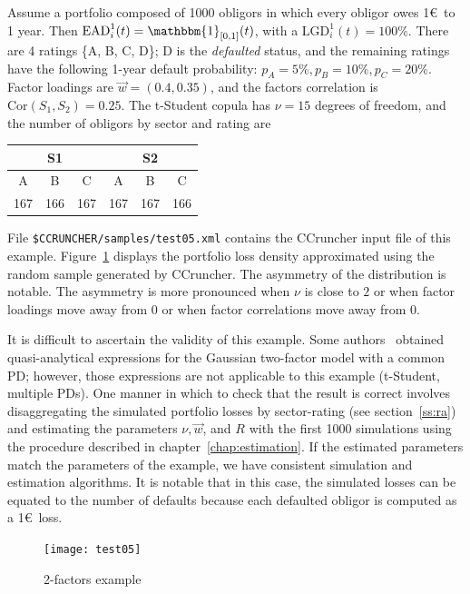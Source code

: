 \documentclass[11pt,fleqn]{book} %
\begin{document}
\begin{example}[2 factors]
	\label{ex:test05}
	Assume a portfolio composed of \num{1000} obligors in which every obligor 
	owes 1\euro\ to 1 year. Then $\text{EAD}_i^1(t) = \mathbbm{1}_{[0,1]}(t)$, 
	with a $\text{LGD}_i^1(t)=100\%$. There are 4 ratings \{A, B, C, D\}; D is 
	the \emph{defaulted} status, and the remaining ratings have the following 
	1-year default probability: $p_A = 5\%, p_B = 10\%, p_C = 20\%$. Factor 
	loadings are $\vec{w} = (0.4, 0.35)$, and the factors correlation is 
	$\text{Cor}(S_1,S_2) = 0.25$. The t-Student copula has $\nu=15$ degrees
	of freedom, and the number of obligors by sector and rating are

	\hspace*{1cm}
	\begin{tabular}{|c|c|c||c|c|c|}
		\hline
		\multicolumn{3}{|c||}{S1} & \multicolumn{3}{|c|}{S2} \\
		\hline
		A & B & C & A & B & C \\
		\hline
		167 & 166 & 167 & 167 & 167 & 166 \\
		\hline
	\end{tabular}

	File \texttt{\$CCRUNCHER/samples/test05.xml} contains the CCruncher input
	file of this example. Figure~\ref{fig:test05} displays the portfolio
	loss density approximated using the random sample generated by CCruncher.
	The asymmetry of the distribution is notable. The asymmetry is more 
	pronounced when $\nu$ is close to $2$ or when factor loadings move away 
	from $0$ or when factor correlations move away from $0$.

	It is difficult to ascertain the validity of this example. Some 
	authors~\cite{cespedes:2002} obtained quasi-analytical expressions for 
	the Gaussian two-factor model with a common PD; however, those expressions 
	are not applicable to this example (t-Student, multiple PDs). One manner in 
	which to check that the result is correct involves disaggregating the 
	simulated portfolio losses by sector-rating (see section~\ref{ss:ra}) and 
	estimating the parameters $\nu, \vec{w}$, and $R$ with the first \num{1000} 
	simulations using the procedure described in chapter~\ref{chap:estimation}. 
	If the estimated parameters match the parameters of the example, we have
	consistent simulation and estimation algorithms. It is notable that in 
	this case, the simulated losses can be equated to the number of defaults 
	because each defaulted obligor is computed as a 1\euro\ loss.
	\begin{figure}[ht]
		\centering
		\texttt{[image: test05]}
		\caption{2-factors example}
		\label{fig:test05}
	\end{figure}
\end{example}
\end{document}
